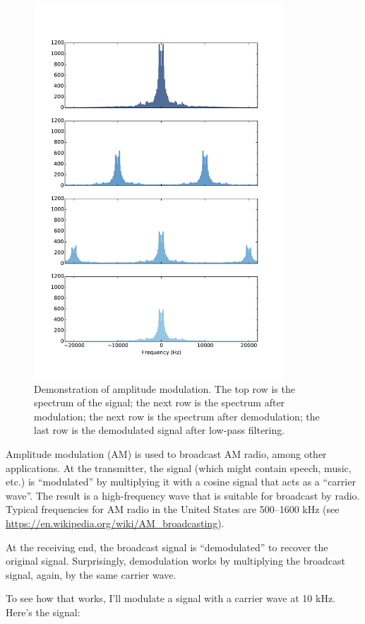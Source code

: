 \documentclass[12pt]{book}
\begin{document}
\begin{figure}
\centerline{\includegraphics[height=5.5in]{figs/sampling2.pdf}}
\caption{Demonstration of amplitude modulation.  The top row is the
spectrum of the signal; the next row is the spectrum after modulation;
the next row is the spectrum after demodulation; the last row is the
demodulated signal after low-pass filtering.}
\label{fig.sampling2}
\end{figure}

Amplitude modulation (AM) is used to broadcast AM radio, among other
applications.  At the transmitter, the signal (which might contain
speech, music, etc.) is ``modulated'' by multiplying it with a cosine
signal that acts as a ``carrier wave''.  The result is a
high-frequency wave that is suitable for broadcast by radio.  Typical
frequencies for AM radio in the United States are 500--1600 kHz (see
\url{https://en.wikipedia.org/wiki/AM_broadcasting}).

At the receiving end, the broadcast signal is ``demodulated'' to
recover the original signal.  Surprisingly, demodulation works by
multiplying the broadcast signal, again, by the same carrier wave.

To see how that works, I'll modulate a signal with a carrier wave at
10 kHz.  Here's the signal:
\end{document}
